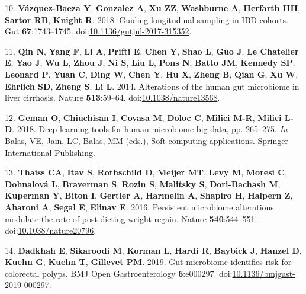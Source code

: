 \documentclass[11pt,]{article}
\begin{document}
\hypertarget{ref-vazquez-baeza_guiding_2018}{}
10. \textbf{Vázquez-Baeza Y}, \textbf{Gonzalez A}, \textbf{Xu ZZ},
\textbf{Washburne A}, \textbf{Herfarth HH}, \textbf{Sartor RB},
\textbf{Knight R}. 2018. Guiding longitudinal sampling in IBD cohorts.
Gut \textbf{67}:1743--1745.
doi:\href{https://doi.org/10.1136/gutjnl-2017-315352}{10.1136/gutjnl-2017-315352}.

\hypertarget{ref-qin_alterations_2014}{}
11. \textbf{Qin N}, \textbf{Yang F}, \textbf{Li A}, \textbf{Prifti E},
\textbf{Chen Y}, \textbf{Shao L}, \textbf{Guo J}, \textbf{Le Chatelier
E}, \textbf{Yao J}, \textbf{Wu L}, \textbf{Zhou J}, \textbf{Ni S},
\textbf{Liu L}, \textbf{Pons N}, \textbf{Batto JM}, \textbf{Kennedy SP},
\textbf{Leonard P}, \textbf{Yuan C}, \textbf{Ding W}, \textbf{Chen Y},
\textbf{Hu X}, \textbf{Zheng B}, \textbf{Qian G}, \textbf{Xu W},
\textbf{Ehrlich SD}, \textbf{Zheng S}, \textbf{Li L}. 2014. Alterations
of the human gut microbiome in liver cirrhosis. Nature
\textbf{513}:59--64.
doi:\href{https://doi.org/10.1038/nature13568}{10.1038/nature13568}.

\hypertarget{ref-geman_deep_2018}{}
12. \textbf{Geman O}, \textbf{Chiuchisan I}, \textbf{Covasa M},
\textbf{Doloc C}, \textbf{Milici M-R}, \textbf{Milici L-D}. 2018. Deep
learning tools for human microbiome big data, pp. 265--275. \emph{In}
Balas, VE, Jain, LC, Balas, MM (eds.), Soft computing applications.
Springer International Publishing.

\hypertarget{ref-thaiss_persistent_2016}{}
13. \textbf{Thaiss CA}, \textbf{Itav S}, \textbf{Rothschild D},
\textbf{Meijer MT}, \textbf{Levy M}, \textbf{Moresi C},
\textbf{Dohnalová L}, \textbf{Braverman S}, \textbf{Rozin S},
\textbf{Malitsky S}, \textbf{Dori-Bachash M}, \textbf{Kuperman Y},
\textbf{Biton I}, \textbf{Gertler A}, \textbf{Harmelin A},
\textbf{Shapiro H}, \textbf{Halpern Z}, \textbf{Aharoni A},
\textbf{Segal E}, \textbf{Elinav E}. 2016. Persistent microbiome
alterations modulate the rate of post-dieting weight regain. Nature
\textbf{540}:544--551.
doi:\href{https://doi.org/10.1038/nature20796}{10.1038/nature20796}.

\hypertarget{ref-dadkhah_gut_2019}{}
14. \textbf{Dadkhah E}, \textbf{Sikaroodi M}, \textbf{Korman L},
\textbf{Hardi R}, \textbf{Baybick J}, \textbf{Hanzel D}, \textbf{Kuehn
G}, \textbf{Kuehn T}, \textbf{Gillevet PM}. 2019. Gut microbiome
identifies risk for colorectal polyps. BMJ Open Gastroenterology
\textbf{6}:e000297.
doi:\href{https://doi.org/10.1136/bmjgast-2019-000297}{10.1136/bmjgast-2019-000297}.
\end{document}
